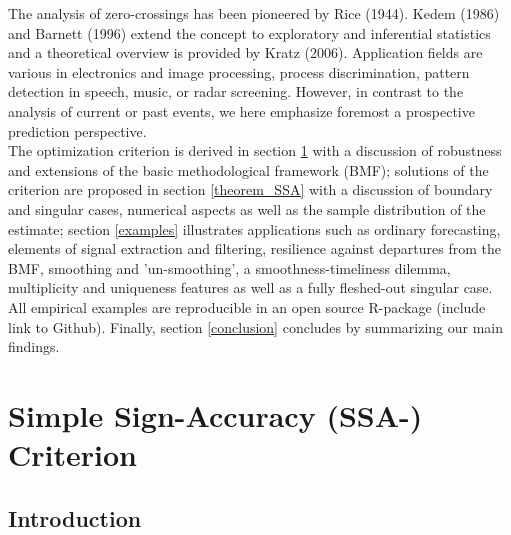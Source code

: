 \documentclass[a4paper]{article}
\begin{document}
    
The analysis of zero-crossings has been pioneered by Rice (1944). Kedem (1986) and Barnett (1996) extend the concept to exploratory and inferential statistics and a theoretical overview is provided by Kratz (2006). Application fields are various in electronics and image processing, process discrimination, pattern detection in speech, music, or radar screening. However, in contrast to the analysis of current or past events, we here emphasize foremost a prospective prediction perspective. \\



The optimization criterion is derived in section \ref{zc} with a discussion of robustness and extensions of the basic methodological framework (BMF); solutions of the criterion are proposed in section \ref{theorem_SSA} with a discussion of boundary and singular cases, numerical aspects as well as the sample distribution of the estimate; section \ref{examples} illustrates applications such as ordinary forecasting, elements of signal extraction and filtering, resilience against departures from the BMF, smoothing and 'un-smoothing', a smoothness-timeliness dilemma, multiplicity and uniqueness features as well as a fully fleshed-out singular case. All empirical examples are reproducible in an open source R-package (include link to Github). Finally, section \ref{conclusion} concludes by summarizing our main findings. 









\section{Simple Sign-Accuracy (SSA-) Criterion} \label{zc}





\subsection{Introduction}
\end{document}
